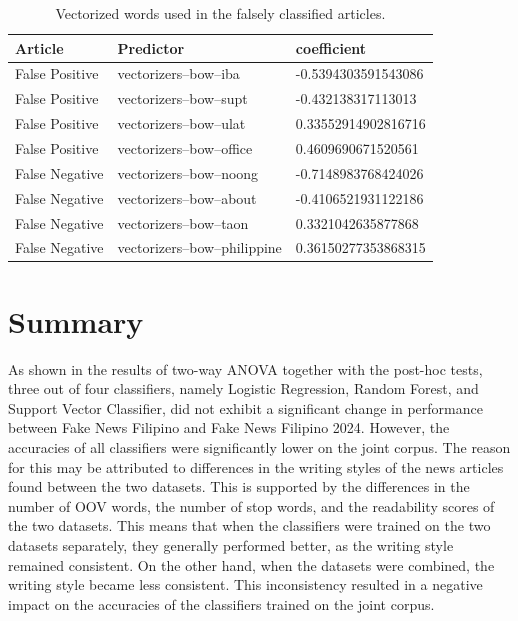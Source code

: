 \begin{table}[ht]
    \begin{tabular}{|l|l|l|}
    \hline
    Article & Predictor & coefficient \\
    \hline
    False Positive & vectorizers--bow--iba & -0.5394303591543086\\
    \hline
    False Positive & vectorizers--bow--supt & -0.432138317113013\\
    \hline
    False Positive & vectorizers--bow--ulat & 0.33552914902816716\\
    \hline
    False Positive & vectorizers--bow--office & 0.4609690671520561\\
    \hline
    False Negative & vectorizers--bow--noong & -0.7148983768424026\\
    \hline
    False Negative & vectorizers--bow--about & -0.4106521931122186\\
    \hline
    False Negative & vectorizers--bow--taon & 0.3321042635877868\\
    \hline
    False Negative & vectorizers--bow--philippine & 0.36150277353868315\\
    \hline
    \end{tabular}
    \caption{Vectorized words used in the falsely classified articles.}
    \label{tab::pred_false_class_vect}
\end{table}

\section{Summary}
\label{dataset-limitation}

As shown in the results of two-way ANOVA together with the post-hoc tests, three out of four classifiers, namely Logistic Regression, Random Forest, and Support Vector Classifier, did not exhibit a significant change in performance between Fake News Filipino and Fake News Filipino 2024. However, the accuracies of all classifiers were significantly lower on the joint corpus. The reason for this may be attributed to differences in the writing styles of the news articles found between the two datasets. This is supported by the differences in the number of OOV words, the number of stop words, and the readability scores of the two datasets. This means that when the classifiers were trained on the two datasets separately, they generally performed better, as the writing style remained consistent. On the other hand, when the datasets were combined, the writing style became less consistent. This inconsistency resulted in a negative impact on the accuracies of the classifiers trained on the joint corpus.

